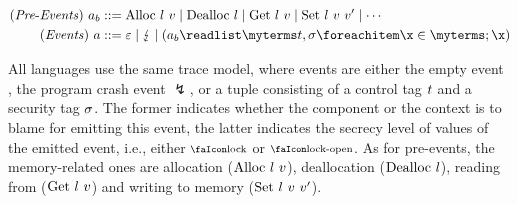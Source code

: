 \documentclass[utf8,acmsmall,review,screen,dvipsnames,anonymous]{acmart}
\begin{document}
\begin{gather*}
  \begin{aligned}
  \mi{(Pre\text{-}Events)}~\event[_{b}]&\bnfdef \ev{Alloc}\ \loc\ \valueexpr \mid \ev{Dealloc}\ \loc \mid \ev{Get}\ \loc\ \valueexpr \mid \ev{Set}\ \loc\ \valueexpr\ \valueexpr['] \mid \cdots \\
  \mi{(Events)}~\event&\bnfdef \emptyevent \mid \lightning \mid \tup{\event[_{b}]}{\sandboxtag,\securitytag} \\
  \end{aligned}
\end{gather*}

All languages use the same trace model, where events are either the empty event \emptyevent, the program crash event $\lightning$, or a tuple consisting of a control tag $t$ and a security tag $\sigma$.
The former indicates whether the component \comp or the context \ctx is to blame for emitting this event, the latter indicates the secrecy level of values of the emitted event, i.e., either $\lock$ or $\unlock$.
As for pre-events, the memory-related ones are allocation ($\text{Alloc}\ l\ v$), deallocation ($\text{Dealloc}\ l$), reading from ($\text{Get}\ l\ v$) and writing to memory ($\ev{Set}\ \loc\ \valueexpr\ \valueexpr[']$).

\end{document}
